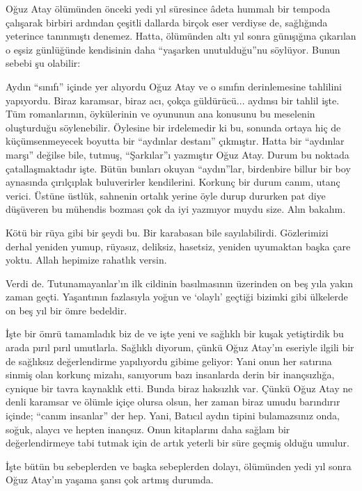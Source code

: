 \documentclass[a5paper,12pt]{scrbook}
\begin{document}
Oğuz Atay ölümünden önceki yedi yıl süresince âdeta hummalı bir tempoda
çalışarak birbiri ardından çeşitli dallarda birçok eser verdiyse de, sağlığında
yeterince tanınmıştı denemez. Hatta, ölümünden altı yıl sonra günışığına
çıkarılan o eşsiz günlüğünde kendisinin daha ``yaşarken unutulduğu''nu söylüyor.
Bunun sebebi şu olabilir:

Aydın ``sınıfı'' içinde yer alıyordu Oğuz Atay ve o sınıfın derinlemesine
tahlilini yapıyordu. Biraz karamsar, biraz acı, çokça güldürücü... aydınsı bir
tahlil işte. Tüm romanlarının, öykülerinin ve oyununun ana konusunu bu meselenin
oluşturduğu söylenebilir. Öylesine bir irdelemedir ki bu, sonunda ortaya hiç de
küçümsenmeyecek boyutta bir ``aydınlar destanı'' çıkmıştır. Hatta bir ``aydınlar
marşı'' değilse bile, tutmuş, ``Şarkılar''ı yazmıştır Oğuz Atay. Durum bu noktada
çatallaşmaktadır işte. Bütün bunları okuyan ``aydın''lar, birdenbire billur bir
boy aynasında çırılçıplak buluverirler kendilerini. Korkunç bir durum canım,
utanç verici. Üstüne üstlük, sahnenin ortalık yerine öyle durup dururken pat
diye düşüveren bu mühendis bozması çok da iyi yazmıyor muydu size. Alın bakalım.

Kötü bir rüya gibi bir şeydi bu. Bir karabasan bile sayılabilirdi. Gözlerimizi
derhal yeniden yumup, rüyasız, deliksiz, hasetsiz, yeniden uyumaktan başka çare
yoktu. Allah hepimize rahatlık versin.

Verdi de. Tutunamayanlar'ın ilk cildinin basılmasının üzerinden on beş yıla
yakın zaman geçti. Yaşantının fazlasıyla yoğun ve `olaylı' geçtiği bizimki gibi
ülkelerde on beş yıl bir ömre bedeldir.

İşte bir ömrü tamamladık biz de ve işte yeni ve sağlıklı bir kuşak yetiştirdik
bu arada pırıl pırıl umutlarla. Sağlıklı diyorum, çünkü Oğuz Atay'ın eseriyle
ilgili bir de sağlıksız değerlendirme yapılıyordu gibime geliyor: Yani onun her
satırına sinmiş olan korkunç mizahı, sanıyorum bazı insanlarda derin bir
inançsızlığa, cynique bir tavra kaynaklık etti. Bunda biraz haksızlık var. Çünkü
Oğuz Atay ne denli karamsar ve ölümle içiçe olursa olsun, her zaman biraz umudu
barındırır içinde; ``canım insanlar'' der hep. Yani, Batıcıl aydın tipini
bulamazsınız onda, soğuk, alaycı ve hepten inançsız. Onun kitaplarını daha
sağlam bir değerlendirmeye tabi tutmak için de artık yeterli bir süre geçmiş
olduğu umulur.

İşte bütün bu sebeplerden ve başka sebeplerden dolayı, ölümünden yedi yıl sonra
Oğuz Atay'ın yaşama şansı çok artmış durumda.
\end{document}
